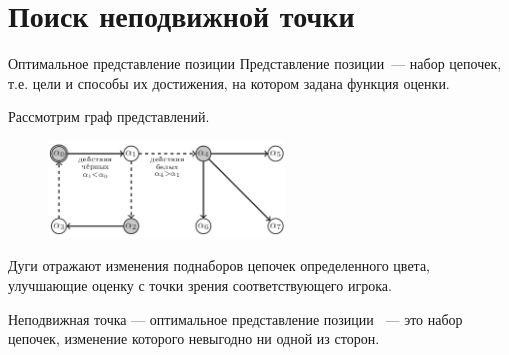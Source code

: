 \documentclass{beamer}
\begin{document}
\section{Поиск неподвижной точки}

\begin{frame}{Оптимальное представление позиции}
Представление позиции~--- набор цепочек, т.е. цели и способы их достижения, на котором задана функция оценки.

\smallskip
\smallskip
Рассмотрим граф представлений.

\begin{figure} 
\vspace{-3ex}
\includegraphics[width=0.56\textwidth]{graph_example}
\end{figure}

Дуги отражают изменения поднаборов цепочек определенного цвета, улучшающие оценку с точки зрения соответствующего игрока.

\smallskip
\smallskip
Неподвижная точка --- оптимальное представление позиции ~---
это набор цепочек, изменение которого невыгодно ни
одной из сторон.

\end{frame}
\end{document}
